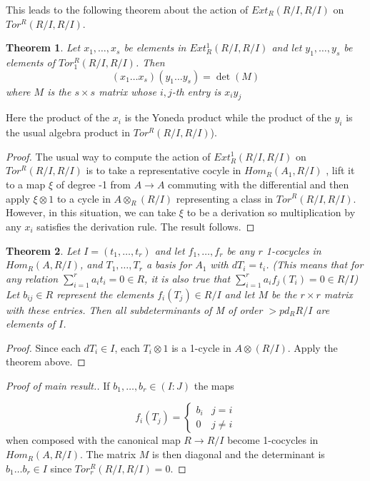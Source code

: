 \documentclass[11pt, oneside]{article}   	%
\newtheorem{Theorem}{Theorem}
\begin{document}
 
This leads to the following theorem
about the action of $Ext_R(R/I,R/I)$
on $Tor^R(R/I,R/I)$.

\begin{Theorem}
 Let $x_1,\ldots,x_s$ be elements in $Ext^1_R(R/I,R/I)$
 and let $y_1,\ldots,y_s$ be
elements of $Tor^R_1(R/I,R/I) $. Then
$$(x_1\ldots x_s)(y_1\ldots y_s) =  \det(M)$$
where $M$ is the $s \times s $ matrix
whose $i,j$-th entry is $x_iy_j$
\end{Theorem}
Here the product of the $x_i $ is the
Yoneda product while the product of the
$y_i$ is the usual
algebra product in $Tor^R(R/I,R/I)$).

\begin{proof}
The usual way to compute the action of    $Ext^1_R(R/I,R/I)$
 on $Tor^R(R/I,R/I) $ is to take a representative cocyle in
$Hom_R(A_1,R/I)$ , lift it to a map $\xi$ of degree -1 from $A \to A$
commuting with the differential and then apply $\xi \otimes 1$ to a cycle
in $A \otimes_R (R/I)$ representing a class in $Tor^R(R/I,R/I) $.
However, in this situation, we can take $\xi $ to be a derivation so
multiplication by any $x_i$ satisfies the derivation rule. The result follows. 
\end{proof}

\begin{Theorem}
 Let $I=(t_1,\ldots,t_r)$ and
let $f_1,\ldots,f_r$ be any $r$ 1-cocycles in $Hom_R(A,R/I) $, and
$T_1,\ldots,T_r$ a basis for $A_1$ with $dT_i = t_i$. (This
means that for any relation $\sum_{i=1}^ra_it_i =0 \in R$,  it is also true that
$\sum_{i=1}^ra_if_j(T_i) = 0 \in R/I $) Let $b_{ij} \in R $ represent the
elements $f_i(T_j) \in R/I$ and let $M$ be the $r \times r$ matrix with these
entries. Then all subdeterminants of M of order $> pd_RR/I$ are elements of
$I$.
\end{Theorem}

\begin{proof}
 Since each $dT_i \in I$, each $T_i \otimes 1 $ is a 1-cycle in
$A \otimes (R/I) $. Apply the theorem above.
\end{proof}
 
\begin{proof}[Proof of main result.]
If $b_1,\ldots,b_r  \in (I:J) $ the maps

$$ 
f_i(T_j) = 
\begin{cases}
  b_i & j=i \\ 
  0 & j\neq i
\end{cases}
$$
when composed with the canonical map $R \to R/I$
 become  1-cocycles in $Hom_R(A,R/I) $.
The matrix $M$
is then diagonal and the determinant is $ b_1\ldots b_r \in I$
since
$Tor^R_r (R/I,R/I) = 0$. 
\end{proof}
\end{document}
